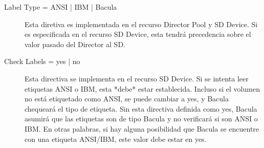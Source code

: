 \begin{description}
\item [ Label Type = ANSI | IBM | Bacula]  
  Esta diretiva es implementada en el recurso Director Pool y SD Device.
  Si es especificada en el recurso SD Device, esta tendrá precedencia 
  sobre el valor pasado del Director al SD.
 
\item [Check Labels = yes | no]
  Esta directiva se implementa en el recurso SD Device. Si se intenta
  leer etiquetas ANSI o IBM, esta *debe* estar establecida. Incluso si el volumen
  no está etiquetado como ANSI, se puede cambiar a yes, y Bacula chequeará el
  tipo de etiqueta. Sin esta directiva definida como yes, Bacula asumirá que 
  las etiquetas son de tipo Bacula y no verificará si son ANSI o IBM. 
  En otras palabras, si hay alguna posibilidad que Bacula se encuentre con
  una etiqueta ANSI/IBM, este valor debe estar en yes.
\end{description}